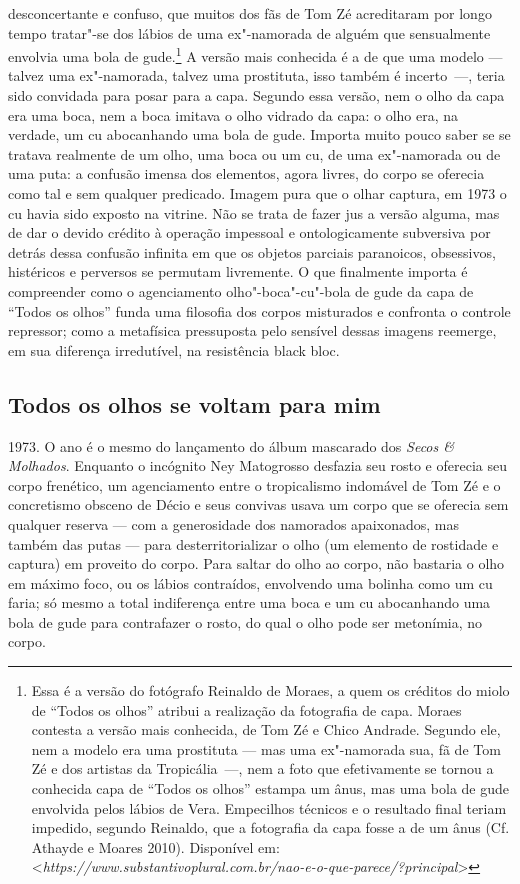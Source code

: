 desconcertante e confuso, que muitos dos fãs de Tom Zé acreditaram por
longo tempo tratar"-se dos lábios de uma ex"-namorada de alguém que
sensualmente envolvia uma bola de gude.\footnote{Essa é
  a versão do fotógrafo Reinaldo de Moraes, a quem os créditos do miolo
  de ``Todos os olhos'' atribui a realização da fotografia de capa.
  Moraes contesta a versão mais conhecida, de Tom Zé e Chico Andrade.
  Segundo ele, nem a modelo era uma prostituta --- mas uma ex"-namorada
  sua, fã de Tom Zé e dos artistas da Tropicália~---, nem a foto que
  efetivamente se tornou a conhecida capa de ``Todos os olhos'' estampa
  um ânus, mas uma bola de gude envolvida pelos lábios de Vera.
  Empecilhos técnicos e o resultado final teriam impedido, segundo
  Reinaldo, que a fotografia da capa fosse a de um ânus (Cf. Athayde e
  Moares 2010). Disponível em:
  \textless{}\emph{https://www.substantivoplural.com.br/nao-e-o-que-parece/?principal}\textgreater{}}
A versão mais conhecida é a de que uma modelo --- talvez uma ex"-namorada,
talvez uma prostituta, isso também é incerto~---, teria sido convidada
para posar para a capa. Segundo essa versão, nem o olho da capa era uma
boca, nem a boca imitava o olho vidrado da capa: o olho era, na verdade,
um cu abocanhando uma bola de gude. Importa muito pouco saber se se
tratava realmente de um olho, uma boca ou um cu, de uma ex"-namorada ou
de uma puta: a confusão imensa dos elementos, agora livres, do corpo se
oferecia como tal e sem qualquer predicado. Imagem pura que o olhar
captura, em 1973 o cu havia sido exposto na vitrine. Não se trata de
fazer jus a versão alguma, mas de dar o devido crédito à operação
impessoal e ontologicamente subversiva por detrás dessa confusão
infinita em que os objetos parciais paranoicos, obsessivos, histéricos e
perversos se permutam livremente. O que finalmente importa é compreender
como o agenciamento olho"-boca"-cu"-bola de gude da capa de ``Todos os
olhos'' funda uma filosofia dos corpos misturados e confronta o controle
repressor; como a metafísica pressuposta pelo sensível dessas imagens
reemerge, em sua diferença irredutível, na resistência black bloc.

\subsection{Todos os olhos se voltam para mim}

1973. O ano é o
mesmo do lançamento do álbum mascarado dos \emph{Secos \& Molhados}.
Enquanto o incógnito Ney Matogrosso desfazia seu rosto e oferecia seu
corpo frenético, um agenciamento entre o tropicalismo indomável de Tom
Zé e o concretismo obsceno de Décio e seus convivas usava um corpo que
se oferecia sem qualquer reserva --- com a generosidade dos namorados
apaixonados, mas também das putas --- para desterritorializar o olho (um
elemento de rostidade e captura) em proveito do corpo. Para saltar do
olho ao corpo, não bastaria o olho em máximo foco, ou os lábios
contraídos, envolvendo uma bolinha como um cu faria; só mesmo a total
indiferença entre uma boca e um cu abocanhando uma bola de gude para
contrafazer o rosto, do qual o olho pode ser metonímia, no corpo.

